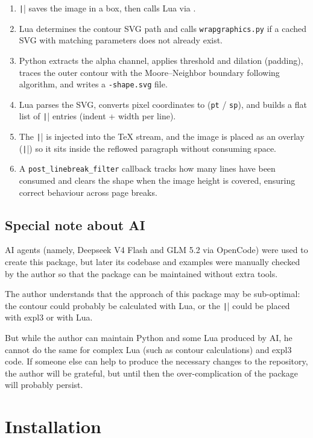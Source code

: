 \documentclass{article}
\begin{document}
\begin{enumerate}
  \item \texttt|\wrapgraphics| saves the image in a box, then calls Lua via \texttt{\string\directlua}.
  \item Lua determines the contour SVG path and calls \texttt{wrapgraphics.py} if a cached SVG with matching parameters does not already exist.
  \item Python extracts the alpha channel, applies threshold and dilation (padding), traces the outer contour with the Moore--Neighbor boundary following algorithm, and writes a \texttt{-shape.svg} file.
  \item Lua parses the SVG, converts pixel coordinates to (\texttt{pt} / \texttt{sp}), and builds a flat list of \texttt|\parshape| entries (indent + width per line).
  \item The \texttt|\parshape| is injected into the TeX stream, and the image is placed as an overlay (\texttt|\rlap|) so it sits inside the reflowed paragraph without consuming space.
  \item A \texttt{post\_linebreak\_filter} callback tracks how many lines have been consumed and clears the shape when the image height is covered, ensuring correct behaviour across page breaks.
\end{enumerate}

\subsection{Special note about AI}

AI agents (namely, Deepseek V4 Flash and GLM 5.2 via OpenCode) were used to create this package, but later its codebase and examples were manually checked by the author so that the package can be maintained without extra tools.

The author understands that the approach of this package may be sub-optimal: the contour could probably be calculated with Lua, or the \texttt|\parshape| could be placed with expl3 or with Lua.

But while the author can maintain Python and some Lua produced by AI, he cannot do the same for complex Lua (such as contour calculations) and expl3 code. If someone else can help to produce the necessary changes to the repository, the author will be grateful, but until then the over-complication of the package will probably persist.

\section{Installation}
\end{document}
